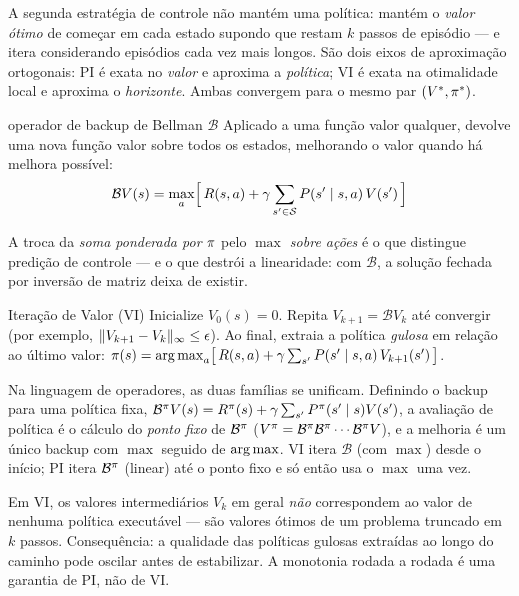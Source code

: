 \documentclass[11pt, a4paper]{article}
\newcommand{\Bop}{\mathcal{B}}
\newcommand{\Bpol}{\mathcal{B}^{\pol}}
\begin{document}
A segunda estratégia de controle não mantém uma política: mantém o \emph{valor ótimo}
de começar em cada estado supondo que restam $k$ passos de episódio --- e itera
considerando episódios cada vez mais longos. São dois eixos de aproximação ortogonais:
PI é exata no \emph{valor} e aproxima a \emph{política}; VI é exata na otimalidade local
e aproxima o \emph{horizonte}. Ambas convergem para o mesmo par $(V^{*}, \pi^{*})$.

\begin{defbox}{operador de backup de Bellman $\Bop$}
Aplicado a uma função valor qualquer, devolve uma nova função valor sobre todos os
estados, melhorando o valor quando há melhora possível:
\[
  \Bop V(s) = \max_{a} \Bigl[\, \rec(s,a) + \gamma \sum_{s' \in \gS} \tran{s'}{s,a}\, V(s') \,\Bigr]
\]
\end{defbox}

A troca da \emph{soma ponderada por $\pi$} pelo \emph{$\max$ sobre ações} é o que
distingue predição de controle --- e o que destrói a linearidade: com $\Bop$, a solução
fechada por inversão de matriz deixa de existir.

\begin{algbox}{Iteração de Valor (VI)}
Inicialize $V_0(s) = 0$. Repita $V_{k+1} = \Bop V_k$ até convergir (por exemplo,
$\lVert V_{k+1} - V_k\rVert_{\infty} \le \epsilon$). Ao final, extraia a política \emph{gulosa} em
relação ao último valor:
$\pi(s) = \operatorname*{arg\,max}_a \bigl[\, R(s,a) + \gamma \sum_{s'} P(s'\mid s,a)\, V_{k+1}(s') \,\bigr]$.
\end{algbox}

Na linguagem de operadores, as duas famílias se unificam. Definindo o backup para uma
política fixa, $\Bpol V(s) = \rec^{\pol}(s) + \gamma \sum_{s'} P^{\pol}(s' \mid s) V(s')$,
a avaliação de política é o cálculo do \emph{ponto fixo} de $\Bpol$
($\Vpi = \Bpol \Bpol \cdots \Bpol V$), e a melhoria é um único backup com $\max$ seguido
de $\operatorname*{arg\,max}$. VI itera $\Bop$ (com $\max$) desde o início; PI itera $\Bpol$ (linear) até
o ponto fixo e só então usa o $\max$ uma vez.

\begin{alertabox}
Em VI, os valores intermediários $V_k$ em geral \emph{não} correspondem ao valor de
nenhuma política executável --- são valores ótimos de um problema truncado em $k$
passos. Consequência: a qualidade das políticas gulosas extraídas ao longo do caminho
pode oscilar antes de estabilizar. A monotonia rodada a rodada é uma garantia de PI, não
de VI.
\end{alertabox}
\end{document}
